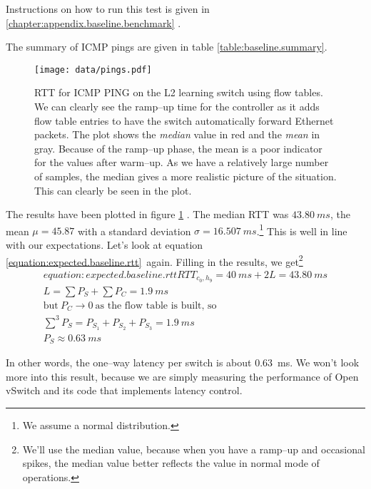 Instructions on how to run this test is given in
\ref{chapter:appendix.baseline.benchmark}
.

The summary of ICMP pings are given in table \ref{table:baseline.summary}.



\begin{figure}
  \centering
  \texttt{[image: data/pings.pdf]}
  \caption{\acs{RTT} for ICMP PING on the L2 learning switch using flow tables.
           We can clearly see the ramp--up time for the controller as it
           adds flow table entries to have the switch automatically forward
           Ethernet packets. The plot shows the \textit{median} value in red
  and the \textit{mean} in gray.  Because of the ramp--up phase, the mean is a poor
  indicator for the values after warm--up.  As we have a relatively large
  number of samples, the median gives a more realistic picture of the
  situation.  This can clearly be seen in the plot.}
  \label{benchmark:l2.learning.switch.ping}
\end{figure}

The results have been plotted in figure
\ref{benchmark:l2.learning.switch.ping}
.
The median RTT was $43.80~ms$, the mean $\mu = 45.87$ with a standard deviation
$\sigma = 16.507~ms$.\footnote{We assume a normal distribution.}
This is well in line with our expectations.  Let's look at equation
\ref{equation:expected.baseline.rtt} again. Filling in the
results, we get\footnote{We'll use the median value, because when you have a
ramp--up and occasional spikes, the median value better reflects the value
in normal mode of operations.}
\begin{gather}
equation:expected.baseline.rtt
  RTT_{c_0,h_9} = 40~ms + 2L = 43.80~ms \\
  L = \sum P_S + \sum P_C = 1.9~ms \\
  \text{but}~P_C \to 0~\text{as the flow table is built, so} \\
  \sum^{3} P_S = P_{S_1} + P_{S_2} + P_{S_3} = 1.9~ms \\
  P_S \approx 0.63~ms
\end{gather}

In other words, the one--way latency per switch is about
0.63~ms. We won't look more into this result, because we are simply
measuring the performance of Open vSwitch and its code that implements
latency control.

